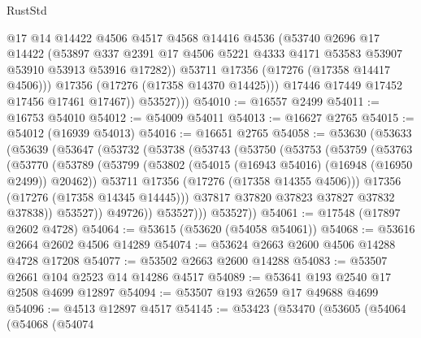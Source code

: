 \begin{lexlean}{RustStd}
\begin{coremodule}
                  @17
                  @14
                  @14422
                  @4506
                  @4517
                  @4568
                  @14416
                  @4536
                  (@53740
                    @2696
                    @17
                    @14422
                    (@53897
                      @337
                      @2391
                      @17
                      @4506
                      @5221
                      @4333
                      @4171
                      @53583
                      @53907
                      @53910
                      @53913
                      @53916
                      @17282))
                  @53711
                  @17356
                  (@17276 (@17358 @14417 @4506)))
                @17356
                (@17276 (@17358 @14370 @14425)))
              @17446
              @17449
              @17452
              @17456
              @17461
              @17467))
          @53527)))
@54010 := @16557 @2499
@54011 := @16753 @54010
@54012 := @54009 @54011
@54013 := @16627 @2765
@54015 := @54012 (@16939 @54013)
@54016 := @16651 @2765
@54058 := @53630
    (@53633
      (@53639
        (@53647
          (@53732
            (@53738
              (@53743
                (@53750
                  (@53753
                    (@53759
                      (@53763
                        (@53770
                          (@53789
                            (@53799
                              (@53802 (@54015 (@16943 @54016) (@16948 (@16950 @2499)) @20462))
                              @53711
                              @17356
                              (@17276 (@17358 @14355 @4506)))
                            @17356
                            (@17276 (@17358 @14345 @14445)))
                          @37817
                          @37820
                          @37823
                          @37827
                          @37832
                          @37838))
                      @53527))
                  @49726))
              @53527)))
        @53527))
@54061 := @17548 (@17897 @2602 @4728)
@54064 := @53615 (@53620 (@54058 @54061))
@54068 := @53616 @2664 @2602 @4506 @14289
@54074 := @53624 @2663 @2600 @4506 @14288 @4728 @17208
@54077 := @53502 @2663 @2600 @14288
@54083 := @53507 @2661 @104 @2523 @14 @14286 @4517
@54089 := @53641 @193 @2540 @17 @2508 @4699 @12897
@54094 := @53507 @193 @2659 @17 @49688 @4699
@54096 := @4513 @12897 @4517
@54145 := @53423
    (@53470
      (@53605
        (@54064
          (@54068
            (@54074

\end{coremodule}
\end{lexlean}

